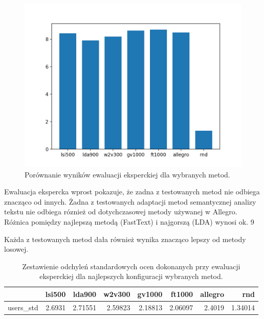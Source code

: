 \documentclass[pl]{minipw} %
\begin{document}
\begin{figure}[H]
	\centering
	\includegraphics[width=1\textwidth]{img/results/lsi500_lda900_w2v300_gv1000_ft1000_allegro_rnd_users.png}
	\caption{Porównanie wyników ewaluacji eksperckiej dla wybranych metod.}
\end{figure}

Ewaluacja ekspercka wprost pokazuje, że zadna z testowanych metod nie odbiega znacząco od innych. Żadna z testowanych adaptacji metod semantycznej analizy tekstu nie odbiega róznież od dotychczasowej metody używanej w Allegro. Różnica pomiędzy najlepszą metodą (FastText) i najgorszą (LDA) wynosi ok. 9%

Każda z testowanych metod dała również wynika znacząco lepszy od metody losowej.


\begin{table}[H]
	\centering
	\begin{tabular}{lrrrrrrr}
		\hline
		&   lsi500 &   lda900 &   w2v300 &   gv1000 &   ft1000 &   allegro &     rnd \\
		\hline
		users\_std &   2.6931 &  2.71551 &  2.59823 &  2.18813 &  2.06097 &    2.4019 & 1.34014 \\
		\hline
	\end{tabular}
	\caption{Zestawienie odchyleń standardowych ocen dokonanych przy ewaluacji eksperckiej dla najlepszych konfiguracji wybranych metod.}
\end{table}
\end{document}
